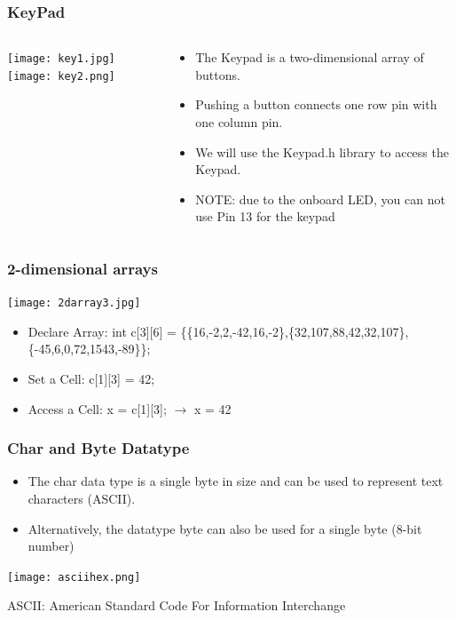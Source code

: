 \documentclass{beamer}
\begin{document}
\begin{frame}\frametitle{KeyPad}
\begin{columns}
\begin{column}{4.5cm}
\begin{center}
\texttt{[image: key1.jpg]}
\texttt{[image: key2.png]}
\end{center}
\end{column}
\begin{column}{7.2cm}
\begin{itemize}
\item The Keypad is a two-dimensional array of buttons.
\item Pushing a button connects one row pin with one column pin.
\item We will use the Keypad.h library to access the Keypad.
\item NOTE: due to the onboard LED, you can not use Pin 13 for the keypad
\end{itemize}
\end{column}
\end{columns}
\end{frame}

\begin{frame}\frametitle{2-dimensional arrays}
\begin{center}
\texttt{[image: 2darray3.jpg]}
\end{center}
\begin{itemize}
\item Declare Array: int c[3][6] = \{\{16,-2,2,-42,16,-2\},\{32,107,88,42,32,107\},\{-45,6,0,72,1543,-89\}\};
\item Set a Cell: c[1][3] = 42; 
\item Access a Cell: x = c[1][3]; $\rightarrow$ x = 42
\end{itemize}
\end{frame}


\begin{frame}\frametitle{Char and Byte Datatype}
\begin{itemize}
\item The char data type is a single byte in size and can be used to represent text characters (ASCII).
\item Alternatively, the datatype byte can also be used for a single byte (8-bit number)
\end{itemize}
\begin{center}
\texttt{[image: asciihex.png]}
\end{center}
ASCII: American Standard Code For Information Interchange
\end{frame}
\end{document}
